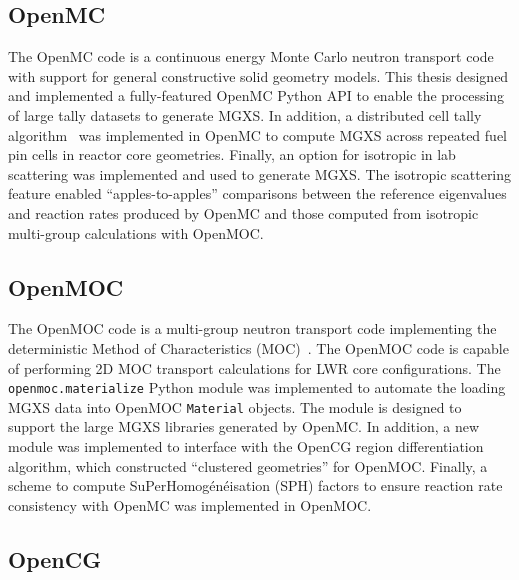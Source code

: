 \documentclass[12pt,twoside]{mitthesis-exec}
\begin{document}
\subsection*{OpenMC}

The OpenMC code is a continuous energy Monte Carlo neutron transport code~\cite{romano2013openmc} with support for general constructive solid geometry models. This thesis designed and implemented a fully-featured OpenMC Python API to enable the processing of large tally datasets to generate MGXS. In addition, a distributed cell tally algorithm~\cite{lax2014distribcell} was implemented in OpenMC to compute MGXS across repeated fuel pin cells in reactor core geometries. Finally, an option for isotropic in lab scattering was implemented and used to generate MGXS. The isotropic scattering feature enabled ``apples-to-apples'' comparisons between the reference eigenvalues and reaction rates produced by OpenMC and those computed from isotropic multi-group calculations with OpenMOC. 


\subsection*{OpenMOC}

The OpenMOC code is a multi-group neutron transport code implementing the deterministic Method of Characteristics (MOC)~\cite{boyd2014openmoc}. The OpenMOC code is capable of performing 2D MOC transport calculations for LWR core configurations. The \texttt{openmoc.materialize} Python module was implemented to automate the loading MGXS data into OpenMOC \texttt{Material} objects. The module is designed to support the large MGXS libraries generated by OpenMC. In addition, a new module was implemented  to interface with the OpenCG region differentiation algorithm, which constructed ``clustered geometries'' for OpenMOC. Finally, a scheme to compute SuPerHomog\'{e}n\'{e}isation (SPH) factors to ensure reaction rate consistency with OpenMC was implemented in OpenMOC. 


\subsection*{OpenCG}
\end{document}

